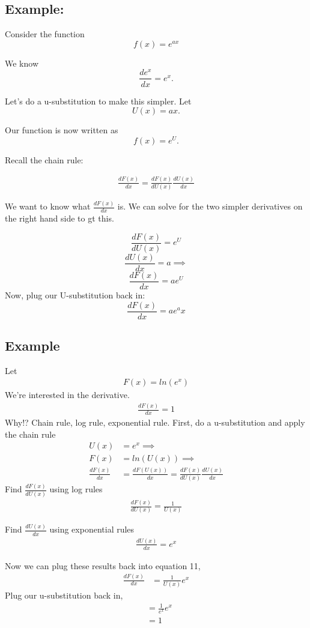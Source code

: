 \documentclass{article}
\begin{document}
\subsection{Example:}
Consider the function \[f(x) = e^{ax}\]

We know \[\frac{de^x}{dx} = e^x.\] 

Let's do a u-substitution to make this simpler. Let \[U(x) = ax.\]  

Our function is now written as \[f(x) = e^U.\] 

Recall the chain rule:

\begin{align}
   \frac{dF(x)}{dx} = \frac{dF(x)}{dU(x)}\frac{dU(x)}{dx} 
\end{align}

We want to know what $\frac{dF(x)}{dx}$ is. We can solve for the two simpler derivatives on the right hand side to gt this. 

\[\frac{dF(x)}{dU(x)} = e^U \]
\[\frac{dU(x)}{dx}  = a \implies\]
\[\frac{dF(x)}{dx} = a e^U \]
Now, plug our U-substitution back in: 
\[\frac{dF(x)}{dx} = a e^ax \]

\subsection{Example}
Let 
\begin{align}
    F(x) = ln(e^x)
\end{align}
We're interested in the derivative. 
\begin{align}
    \frac{dF(x)}{dx} = 1
\end{align}
Why!? Chain rule, log rule, exponential rule. First, do a u-substitution and apply the chain rule
\begin{align}
    U(x) &= e^x \implies\\
    F(x) &= ln(U(x)) \implies \\
    \frac{dF(x)}{dx} &= \frac{dF(U(x))}{dx} = \frac{dF(x)}{dU(x)}\frac{dU(x)}{dx}
\end{align}
Find $\frac{dF(x)}{dU(x)}$ using log rules 
\begin{align}
    \frac{dF(x)}{dU(x)} = \frac{1}{U(x)}
\end{align}

Find $\frac{dU(x)}{dx}$ using exponential rules 
\begin{align}
    \frac{dU(x)}{dx} = e^x
\end{align}

Now we can plug these results back into equation 11, 
\begin{align}
    \frac{dF(x)}{dx} &= \frac{1}{U(x)} e^x
\end{align}
Plug our u-substitution back in, 
\begin{align}
    &= \frac{1}{e^x} e^x \\
    &= 1
\end{align}
\end{document}
